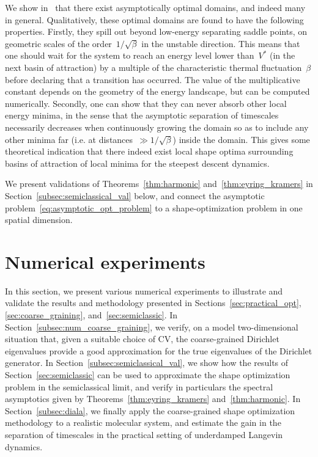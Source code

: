 \documentclass[a4]{article}
\newcommand{\1}{\mathbbm 1}
\newcommand{\Vstar}{V^*}
\begin{document}
    We show in~\cite[Section 3.3]{BLS24} that there exist asymptotically optimal domains, and indeed many in general. Qualitatively, these optimal domains are found to have the following properties. Firstly, they spill out beyond low-energy separating saddle points, on geometric scales of the order~$1/\sqrt\beta$ in the unstable direction. This means that one should wait for the system to reach an energy level lower than~$\Vstar$ (in the next basin of attraction) by a multiple of the characteristic thermal fluctuation~$\beta$ before declaring that a transition has occurred. The value of the multiplicative constant depends on the geometry of the energy landscape, but can be computed numerically.
    Secondly, one can show that they can never absorb other local energy minima, in the sense that the asymptotic separation of timescales necessarily decreases when continuously growing the domain so as to include any other minima far (i.e. at distances~$\gg1/\sqrt\beta$) inside the domain. This gives some theoretical indication that there indeed exist local shape optima surrounding basins of attraction of local minima for the steepest descent dynamics.

    We present validations of Theorems~\ref{thm:harmonic} and~\ref{thm:eyring_kramers} in Section~\ref{subsec:semiclassical_val} below, and connect the asymptotic problem~\eqref{eq:asymptotic_opt_problem} to a shape-optimization problem in one spatial dimension.
\section{Numerical experiments}
\label{sec:numerical}
In this section, we present various numerical experiments to illustrate and validate the results and methodology presented in Sections~\ref{sec:practical_opt}, \ref{sec:coarse_graining}, and~\ref{sec:semiclassic}. In Section~\ref{subsec:num_coarse_graining}, we verify, on a model two-dimensional situation that, given a suitable choice of CV, the coarse-grained Dirichlet eigenvalues provide a good approximation for the true eigenvalues of the Dirichlet generator.
In Section~\ref{subsec:semiclassical_val}, we show how the results of Section~\ref{sec:semiclassic} can be used to approximate the shape optimization problem in the semiclassical limit, and verify in particulars the spectral asymptotics given by Theorems~\ref{thm:eyring_kramers} and~\ref{thm:harmonic}.
In Section~\ref{subsec:diala}, we finally apply the coarse-grained shape optimization methodology to a realistic molecular system, and estimate the gain in the separation of timescales in the practical setting of underdamped Langevin dynamics.
\end{document}
